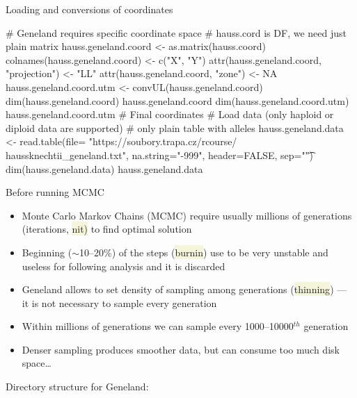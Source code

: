 \documentclass[compress, ucs, xelatex, 11pt, xcolor=svgnames, aspectratio=169,
	hyperref={
		bookmarks=true,
		unicode=true,
		colorlinks=true,
		pdftitle={Molecular data in R},
		plainpages=false,
		pdfauthor={Vojtech Zeisek},
		pdfsubject={Course about phylogeny and evolution in R},
		pdfcreator={XeLaTeX},
		pdfkeywords={R, evolution, phylogeny, molecular data},
		linkcolor=Crimson, %
		anchorcolor=Magenta, %
		citecolor=Magenta, %
		filecolor=Magenta, %
		menucolor=Magenta, %
		urlcolor=DodgerBlue, %
		pdftex},
	url={hyphens, lowtilde} %
	]{beamer}
\renewcommand{\texttt}[1]{\colorbox{Beige}{{\ttfamily #1}}}
\begin{document}
\begin{frame}[fragile]{Loading and conversions of coordinates}
	\begin{spluscode}
    # Geneland requires specific coordinate space
    # hauss.cord is DF, we need just plain matrix
    hauss.geneland.coord <- as.matrix(hauss.coord)
    colnames(hauss.geneland.coord) <- c("X", "Y")
    attr(hauss.geneland.coord, "projection") <- "LL"
    attr(hauss.geneland.coord, "zone") <- NA
    hauss.geneland.coord.utm <- convUL(hauss.geneland.coord)
    dim(hauss.geneland.coord)
    hauss.geneland.coord
    dim(hauss.geneland.coord.utm)
    hauss.geneland.coord.utm # Final coordinates
    # Load data (only haploid or diploid data are supported)
    # only plain table with alleles
    hauss.geneland.data <- read.table(file= "https://soubory.trapa.cz/rcourse/
      haussknechtii_geneland.txt", na.string="-999", header=FALSE, sep="\t")
    dim(hauss.geneland.data)
    hauss.geneland.data
	\end{spluscode}
\end{frame}

\begin{frame}{Before running MCMC}
	\begin{multicols}{2}
		\begin{itemize}
			\item Monte Carlo Markov Chains (MCMC) require usually millions of generations (iterations, \texttt{nit)} to find optimal solution
			\item Beginning ($\sim$10--20\%) of the steps (\texttt{burnin}) use to be very unstable and useless for following analysis and it is discarded
			\item Geneland allows to set density of sampling among generations (\texttt{thinning}) --- it is not necessary to sample every generation
			\item Within millions of generations we can sample every 1000--10000$^{th}$ generation
			\item Denser sampling produces smoother data, but can consume too much disk space\ldots
		\end{itemize}
		\vfill
		Directory structure for Geneland:
		\vfil
		\begin{center}
			\texttt{[image: genelad\_dirs.png]}
		\end{center}
		\vfill
	\end{multicols}
\end{frame}
\end{document}
